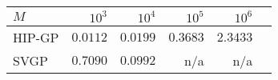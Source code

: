 \begin{tabular}{lrrrrr}
\toprule
$M$ &     $10^3$       & $10^4$     & $10^5$     & $10^6$  \\
\midrule
HIP-GP   &  $\mathbf{0.0112}$  &  $\mathbf{0.0199}$  &  $\mathbf{0.3683}$  &  $\mathbf{2.3433}$  \\
SVGP     &  $0.7090$ &   $0.0992$  &   n/a      & n/a       \\
\bottomrule
\end{tabular}
